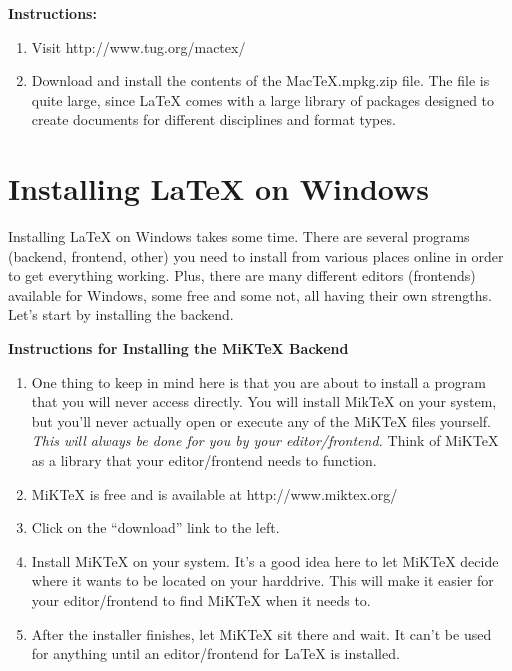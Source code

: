 \documentclass{article}
\begin{document}
\bigbreak\textbf{Instructions:}

\begin{enumerate}
 \item Visit http://www.tug.org/mactex/
 \item Download and install the contents of the MacTeX.mpkg.zip file. The file is quite large, since LaTeX comes with a large library of packages designed to create documents for different disciplines and format types.
\end{enumerate}



\section{Installing LaTeX on Windows}

Installing LaTeX on Windows takes some time. There are several programs (backend, frontend, other) you need to install from various places online in order to get everything working. Plus, there are many different editors (frontends) available for Windows, some free and some not, all having their own strengths. Let's start by installing the backend.

\bigbreak\textbf{Instructions for Installing the MiKTeX Backend}

\begin{enumerate}
 \item One thing to keep in mind here is that you are about to install a program that you will never access directly. You will install MikTeX on your system, but you'll never actually open or execute any of the MiKTeX files yourself. \textit{This will always be done for you by your editor/frontend.} Think of MiKTeX as a library that your editor/frontend needs to function.
\item MiKTeX is free and is available at http://www.miktex.org/
\item Click on the ``download'' link to the left.
\item Install MiKTeX on your system. It's a good idea here to let MiKTeX decide where it wants to be located on your harddrive. This will make it easier for your editor/frontend to find MiKTeX when it needs to.
\item After the installer finishes, let MiKTeX sit there and wait. It can't be used for anything until an editor/frontend for LaTeX is installed.
\end{enumerate}
\end{document}

